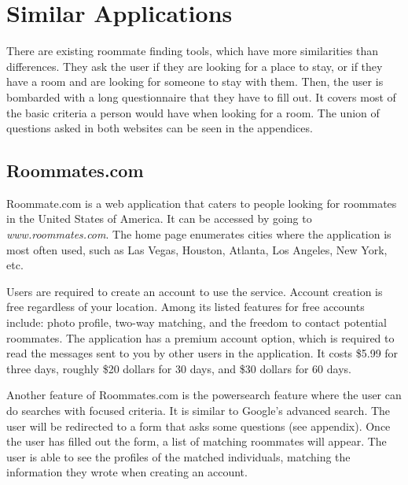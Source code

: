 \documentclass[journal]{./IEEE/IEEEtran}
\begin{document}
\section{Similar Applications}
There are existing roommate finding tools, which have more similarities than differences. They ask the user if they are
looking for a place to stay, or if they have a room and are looking for someone to stay with them. Then, the user is
bombarded with a long questionnaire that they have to fill out. It covers most of the basic criteria a person would have when looking for a room. The union of questions asked in both websites can be seen in the appendices.

\subsection{Roommates.com}
Roommate.com\cite{roommates.com} is a web application that caters to people looking for roommates in the United States of America. It can be accessed by going to \textit{www.roommates.com}. The home page enumerates cities where the application is most often used, such as Las Vegas, Houston, Atlanta, Los Angeles, New York, etc.

Users are required to create an account to use the service. Account creation is free regardless of your location. Among
its listed features for free accounts include: photo profile, two-way matching, and the freedom to contact potential roommates. The application has a premium account option, which is required to read the messages sent to you by other users in the application. It costs \$5.99 for three days, roughly \$20 dollars for 30 days, and \$30 dollars for 60 days.

Another feature of Roommates.com is the powersearch feature where the user can do searches with focused criteria. It is similar to Google's advanced search. The user will be redirected to a form that asks some questions (see appendix). Once the user has filled out the form, a list of matching roommates will appear. The user is able to see the profiles of the matched individuals, matching the information they wrote when creating an account.
\end{document}
